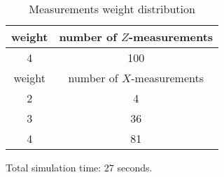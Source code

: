 \documentclass[12pt]{article}
\begin{document}
\begin{table}[h]
\centering
\begin{tabular}{c c}
\hline
weight & number of $Z$-measurements\\
\hline
4 & 100\\
\hline
\hline
weight & number of $X$-measurements\\
\hline
2 & 4\\
3 & 36\\
4 & 81\\
\hline
\end{tabular}
\caption{Measurements weight distribution}
\end{table}
\vspace{.3cm}



\vspace{2cm}
Total simulation time: $27$ seconds.
\end{document}
